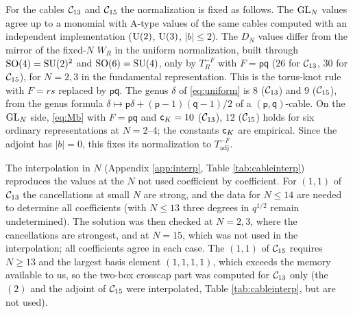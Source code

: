 \begin{result}\label{cr:cable-interp}
For the cables $\mathcal{C}_{13}$ and $\mathcal{C}_{15}$ the normalization is fixed as follows. The $\mathrm{GL}_N$ values agree up to a monomial with A-type values of the same cables computed with an independent implementation ($\mathrm{U}(2)$, $\mathrm{U}(3)$, $|b| \le 2$).
The $D_N$ values differ from the mirror of the fixed-$N$ $W_R$ in the uniform normalization, built through $\mathrm{SO}(4) = \mathrm{SU}(2)^2$ and $\mathrm{SO}(6) = \mathrm{SU}(4)$, only by $T_R^{-F}$ with $F = \mathsf{p}\mathsf{q}$ ($26$ for $\mathcal{C}_{13}$, $30$ for $\mathcal{C}_{15}$), for $N = 2, 3$ in the fundamental representation. This is the torus-knot rule with $F = rs$ replaced by $\mathsf{p}\mathsf{q}$. The genus $\delta$ of \eqref{eq:uniform} is $8$ ($\mathcal{C}_{13}$) and $9$ ($\mathcal{C}_{15}$), from the genus formula $\delta \mapsto \mathsf{p}\delta + (\mathsf{p}-1)(\mathsf{q}-1)/2$ of a $(\mathsf{p},\mathsf{q})$-cable.
On the $\mathrm{GL}_N$ side, \eqref{eq:Mb} with $F = \mathsf{p}\mathsf{q}$ and $\mathsf{c}_K = 10$ ($\mathcal{C}_{13}$), $12$ ($\mathcal{C}_{15}$) holds for six ordinary representations at $N = 2$--4; the constants $\mathsf{c}_K$ are empirical. Since the adjoint has $|b| = 0$, this fixes its normalization to $T_{\mathrm{adj}}^{-F}$.

The interpolation in $N$ (Appendix \ref{app:interp}, Table \ref{tab:cableinterp}) reproduces the values at the $N$ not used coefficient by coefficient. For $(1,1)$ of $\mathcal{C}_{13}$ the cancellations at small $N$ are strong, and the data for $N \le 14$ are needed to determine all coefficients (with $N \le 13$ three degrees in $q^{1/2}$ remain undetermined). The solution was then checked at $N = 2, 3$, where the cancellations are strongest, and at $N = 15$, which was not used in the interpolation; all coefficients agree in each case. The $(1,1)$ of $\mathcal{C}_{15}$ requires $N \ge 13$ and the largest basis element $(1,1,1,1)$, which exceeds the memory available to us, so the two-box crosscap part was computed for $\mathcal{C}_{13}$ only (the $(2)$ and the adjoint of $\mathcal{C}_{15}$ were interpolated, Table \ref{tab:cableinterp}, but are not used).
\end{result}

